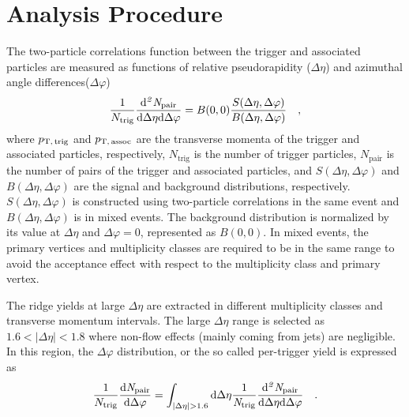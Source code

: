 \section{Analysis Procedure}
\label{sec:ana}

The two-particle correlations function between the trigger and associated particles are measured as functions of relative pseudorapidity ($\Delta\eta$) and azimuthal angle differences($\Delta\varphi$)
\begin{eqnarray}
\frac{1}{N_{\rm{trig}}} \frac{ \rm{d}\it{}^{2} N_{\rm{pair}} }{ \rm{d} \Delta\eta \rm{d}\Delta\varphi} = B(0, 0)\frac{S(\Delta\eta, \Delta\varphi)}{B(\Delta\eta, \Delta\varphi)}\quad,
\label{eq:corrfunction}
\end{eqnarray}
where  $p_\mathrm{T,\,trig}$ and $p_\mathrm{T,\,assoc}$ are the transverse momenta of  the trigger and associated particles, respectively, $N_\mathrm{trig}$ is the number of trigger particles, $N_\mathrm{pair}$ is the number of pairs of the trigger and associated particles, and $S (\Delta\eta, \Delta\varphi)$ and $B (\Delta\eta, \Delta\varphi)$ are the signal and background distributions, respectively. $S (\Delta\eta, \Delta\varphi)$ is constructed using two-particle correlations in the same event and $B(\Delta\eta, \Delta\varphi)$ is in mixed events. The background distribution is normalized by its value at $\Delta\eta$ and $\Delta\varphi = 0$, represented as $B (0,0)$. In mixed events, the primary vertices and multiplicity classes are required to be in the same range to avoid the acceptance effect with respect to the multiplicity class and primary vertex.

The ridge yields at large $\Delta\eta$ are extracted in different multiplicity classes and transverse momentum intervals. The large $\Delta\eta$ range is selected as $1.6<|\Delta\eta|<1.8$ where non-flow effects (mainly coming from jets) are negligible. In this region, the $\Delta\varphi$ distribution, or the so called per-trigger yield is expressed as
\begin{eqnarray}
\frac{1}{N_{\rm{trig}}} \frac{ \rm{d}\it{}N_{\rm{pair}} }{ \rm{d}\Delta\varphi } = \int_{|\Delta \eta|>1.6} \rm{d} \Delta \eta \frac{1}{\it{N}_{\rm{trig}}} \frac{ \rm{d}\it{}^{2} N_{\rm{pair}} }{ \rm{d}\Delta\eta d\Delta\varphi} \quad.
\end{eqnarray}

